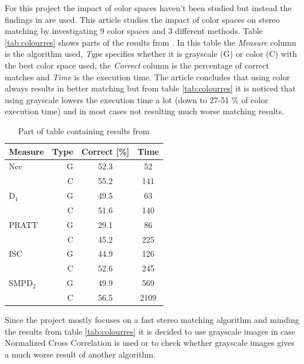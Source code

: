 For this project the impact of color spaces haven't been studied but instead the findings in \cite{chambon2005colour} are used. This article studies the impact of color spaces on stereo matching by investigating 9 color spaces and 3 different methods. Table \vref{tab:colourres} shows parts of the results from \cite{chambon2005colour}. In this table the \textit{Measure} column is the algorithm used, \textit{Type} specifies whether it is grayscale (G) or color (C) with the best color space used, the \textit{Correct} column is the percentage of correct matches and \textit{Time} is the execution time. The article concludes that using color always results in better matching but from table \vref{tab:colourres} it is noticed that using grayscale lowers the execution time a lot (down to 27-51 \% of color execution time) and in most cases not resulting much worse matching results. \\
\begin{table}
  \centering
  \begin{tabular}{l r | c | c }
    Measure & Type & Correct [\%] & Time\\
    \midrule
    Ncc & G & 52.3 & 52\\
          & C & 55.2 & 141\\
    \midrule
    D$_1$ & G & 49.5 & 63\\
               & C & 51.6 & 140\\
    \midrule
    PRATT & G & 29.1 & 86\\
              & C & 45.2 & 225\\
    \midrule
    ISC & G & 44.9 & 126\\
    & C & 52.6 & 245\\
    \midrule
    SMPD$_2$ & G & 49.9 & 569\\
    & C & 56.5 & 2109 \\
  \end{tabular}
  \caption{Part of table containing results from \cite{chambon2005colour}\label{tab:colourres}}
\end{table}

Since the project mostly focuses on a fast stereo matching algorithm and minding the results from table \vref{tab:colourres} it is decided to use grayscale images in case Normalized Cross Correlation is used or to check whether grayscale images gives a much worse result of another algorithm.

